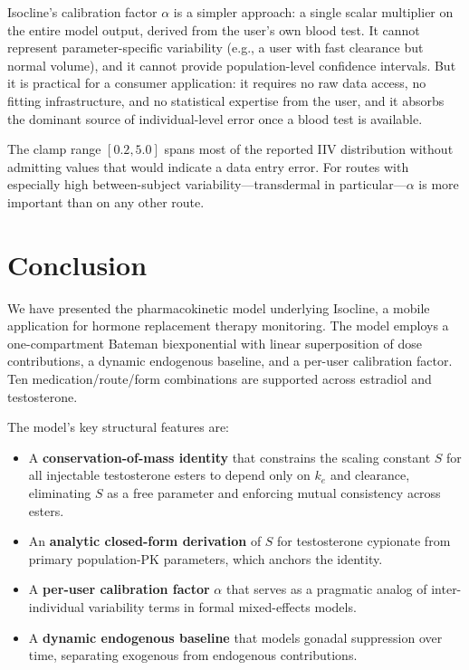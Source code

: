 \documentclass[11pt,a4paper]{article}
\begin{document}
Isocline's calibration factor $\alpha$ is a simpler approach: a single scalar
multiplier on the entire model output, derived from the user's own blood
test. It cannot represent parameter-specific variability (e.g., a user
with fast clearance but normal volume), and it cannot provide
population-level confidence intervals. But it is practical for a
consumer application: it requires no raw data access, no fitting
infrastructure, and no statistical expertise from the user, and it
absorbs the dominant source of individual-level error once a blood test
is available.

The clamp range $[0.2, 5.0]$ spans most of the reported IIV distribution
without admitting values that would indicate a data entry error. For
routes with especially high between-subject variability---transdermal in
particular---$\alpha$ is more important than on any other route.

\section{Conclusion}
\label{sec:conclusion}

We have presented the pharmacokinetic model underlying Isocline, a mobile
application for hormone replacement therapy monitoring. The model
employs a one-compartment Bateman biexponential with linear
superposition of dose contributions, a dynamic endogenous baseline, and
a per-user calibration factor. Ten medication/route/form combinations
are supported across estradiol and testosterone.

The model's key structural features are:
\begin{itemize}[nosep,leftmargin=1.4em]
\item A \textbf{conservation-of-mass identity} that constrains the
  scaling constant $S$ for all injectable testosterone esters to depend
  only on $k_e$ and clearance, eliminating $S$ as a free parameter and
  enforcing mutual consistency across esters.
\item An \textbf{analytic closed-form derivation} of $S$ for
  testosterone cypionate from primary population-PK parameters, which
  anchors the identity.
\item A \textbf{per-user calibration factor} $\alpha$ that serves as a
  pragmatic analog of inter-individual variability terms in formal
  mixed-effects models.
\item A \textbf{dynamic endogenous baseline} that models gonadal
  suppression over time, separating exogenous from endogenous
  contributions.
\end{itemize}
\end{document}
